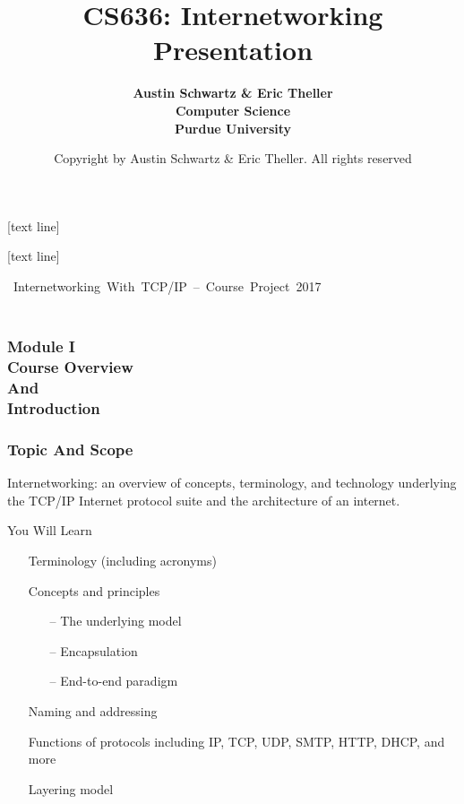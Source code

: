 \documentclass[professionalfonts, t, aspectratio=1610]{beamer}
\title{\textbf{CS636: Internetworking \\ Presentation}}
\date[ISPN ’80]{Copyright \textcopyright 2017 by Austin Schwartz \& Eric Theller. All rights reserved}
\author[Comer]{\textbf{Austin Schwartz \& Eric Theller \\ Computer Science \\ Purdue University}}
\begin{document}
{
  [text line]{%
    \parbox{\linewidth}{
      \vspace*{-28pt}
      \centering\insertdate
    }
  }
  \begin{frame}
    \titlepage
  \end{frame}
}

\addtocounter{framenumber}{-1}

[text line]{%
  \parbox{\linewidth}{
    \vspace*{-16pt}
  \hbox{%
    Internetworking With TCP/IP – Course Project
      \insertsectionnavigationhorizontal{.185\paperwidth}{}{}%
   \insertframenumber
      \insertsectionnavigationhorizontal{.4\paperwidth}{}{}%
    2017
    }
    \vspace{0.1cm}
  \hspace*{\fill}%
    \insertdate
  \hspace*{\fill}\vskip2pt%
  }
}

\begin{frame}

\frametitle{ %
\bigskip \bigskip \bigskip \bigskip \bigskip \bigskip \\
Module I \\ \bigskip
Course Overview \\
And \\
Introduction} 
\end{frame}

\begin{frame} 
\frametitle{Topic And Scope} 
\bigskip
\bigskip
\bigskip
Internetworking: an overview of concepts, terminology, and technology underlying the TCP/IP Internet protocol suite and the architecture of an internet.
\end{frame}

\renewcommand{\baselinestretch}{1.3}
\begin{frame}{You Will Learn}
\begin{itemize}
\item[\textbullet] Terminology (including acronyms)
\item[\textbullet] Concepts and principles
\begin{itemize}
  \item[--] The underlying model
  \item[--] Encapsulation
  \item[--] End-to-end paradigm
\end{itemize}
\item[\textbullet] Naming and addressing
\item[\textbullet] Functions of protocols including IP, TCP, UDP, SMTP, HTTP, DHCP, and more
\item[\textbullet] Layering model
\end{itemize}
\end{frame}
\end{document}
